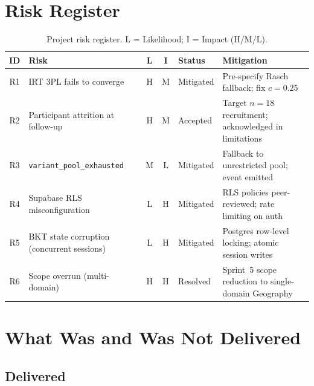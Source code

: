 \section{Risk Register}
\label{sec:meth_risks}

\begin{table}[H]
\centering
\caption{Project risk register. L = Likelihood; I = Impact (H/M/L).}
\label{tab:risk_register}
\renewcommand{\arraystretch}{1.25}
\begin{tabularx}{\textwidth}{cp{4.0cm}ccp{2.0cm}X}
\toprule
\textbf{ID} & \textbf{Risk} & \textbf{L} & \textbf{I} & \textbf{Status} & \textbf{Mitigation} \\
\midrule
R1 & IRT 3PL fails to converge &
  H & M & Mitigated &
  Pre-specify Rasch fallback; fix $c=0.25$ \\
R2 & Participant attrition at follow-up &
  H & M & Accepted &
  Target $n=18$ recruitment; acknowledged in limitations \\
R3 & \texttt{variant\_pool\_\allowbreak exhausted} &
  M & L & Mitigated &
  Fallback to unrestricted pool; event emitted \\
R4 & Supabase RLS misconfiguration &
  L & H & Mitigated &
  RLS policies peer-reviewed; rate limiting on auth \\
R5 & BKT state corruption (concurrent sessions) &
  L & H & Mitigated &
  Postgres row-level locking; atomic session writes \\
R6 & Scope overrun (multi-domain) &
  H & H & Resolved &
  Sprint~5 scope reduction to single-domain Geography \\
\bottomrule
\end{tabularx}
\end{table}

\section{What Was and Was Not Delivered}
\label{sec:meth_delivery}

\subsection{Delivered}

